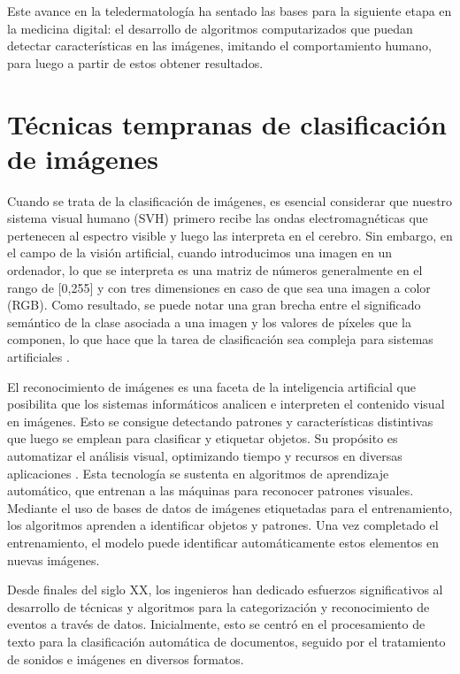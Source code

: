 Este avance en la teledermatología ha sentado las bases para la siguiente etapa en la medicina digital: el desarrollo de algoritmos computarizados que puedan detectar características en las imágenes, imitando el comportamiento humano, para luego a partir de estos obtener resultados.

\section{Técnicas tempranas de clasificación de imágenes} 

Cuando se trata de la clasificación de imágenes, es esencial considerar que nuestro sistema visual humano (SVH) primero recibe las ondas electromagnéticas que pertenecen al espectro visible y luego las interpreta en el cerebro. Sin embargo, en el campo de la visión artificial, cuando introducimos una imagen en un ordenador, lo que se interpreta es una matriz de números generalmente en el rango de [0,255] y con tres dimensiones en caso de que sea una imagen a color (RGB). Como resultado, se puede notar una gran brecha entre el significado semántico de la clase asociada a una imagen y los valores de píxeles que la componen, lo que hace que la tarea de clasificación sea compleja para sistemas artificiales .

El reconocimiento de imágenes es una faceta de la inteligencia artificial que posibilita que los sistemas informáticos analicen e interpreten el contenido visual en imágenes. Esto se consigue detectando patrones y características distintivas que luego se emplean para clasificar y etiquetar objetos. Su propósito es automatizar el análisis visual, optimizando tiempo y recursos en diversas aplicaciones . Esta tecnología se sustenta en algoritmos de aprendizaje automático, que entrenan a las máquinas para reconocer patrones visuales. Mediante el uso de bases de datos de imágenes etiquetadas para el entrenamiento, los algoritmos aprenden a identificar objetos y patrones. Una vez completado el entrenamiento, el modelo puede identificar automáticamente estos elementos en nuevas imágenes.

Desde finales del siglo XX, los ingenieros han dedicado esfuerzos significativos al desarrollo de técnicas y algoritmos para la categorización y reconocimiento de eventos a través de datos. Inicialmente, esto se centró en el procesamiento de texto para la clasificación automática de documentos, seguido por el tratamiento de sonidos e imágenes en diversos formatos. 

